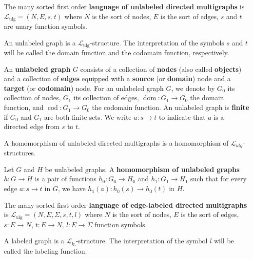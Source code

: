 \begin{definition}
    \label{def:l_ulg}
    The many sorted first order \textbf{language of unlabeled directed multigraphs} is $\mathcal{L}_\text{ulg} \mathop{=} (N,E,s,t)$ where $N$ is the sort of nodes, $E$ is the sort of edges, $s$ and $t$ are unary function symbols.
  \end{definition}
\begin{definition}
    \label{def:ulg}
    An unlabeled graph is a $\mathcal{L}_\text{ulg}$-structure. The interpretation of the symbols $s$ and $t$ will be called the domain function and the codomain function, respectively.
\end{definition}
An \textbf{unlabeled graph} \( G \) consists of a collection of \textbf{nodes} (also called \textbf{objects}) and a collection of \textbf{edges} equipped with a \textbf{source} (or \textbf{domain}) node and a \textbf{target} (or \textbf{codomain}) node. 
For an unlabeled graph \( G \), we denote by \( G_0 \) its collection of nodes, \( G_1 \) its collection of edges, \( \operatorname{dom}:G_1{\to}G_0 \) the domain function, and \( \operatorname{cod}:G_1{\to}G_0 \) the codomain function. An unlabeled graph is \textbf{finite} if \( G_0 \) and \( G_1 \) are both finite sets.
We write \( a: s \mathop{\to} t \) to indicate that \( a \) is a directed edge from \( s \) to \( t \).
\begin{definition}
    \label{def:homomorphism_ulg}
    A homomorphism of unlabeled directed multigraphs is a homomorphism of $\mathcal{L}_{ulg}$-structures.
\end{definition}
Let \( G \) and \( H \) be unlabeled graphs. A \textbf{homomorphism of unlabeled graphs} \( h: G \mathop{\to} H \) is a pair of functions \( h_0: G_0 \mathop{\to} H_0 \) and \( h_1: G_1 \mathop{\to} H_1 \) such that for every edge \( a: s \mathop{\to} t \) in \( G \), we have \( h_1(a) : h_0(s) \mathop{\to} h_0(t) \) in \( H \).
\begin{definition}
    \label{def:l_lg}
    The many sorted first order \textbf{language of edge-labeled directed multigraphs} is $\mathcal{L}_\text{ulg} \mathop{=} (N,E,\Sigma, s,t,l)$ where $N$ is the sort of nodes, $E$ is the sort of edges, $s:E \mathop{\to} N$, $t: E \mathop{\to} N$, $l:E \mathop{\to} \Sigma$ function symbols.
  \end{definition}
\begin{definition}
    \label{def:lg}
    A labeled graph is a $\mathcal{L}_\text{lg}$-structure. The interpretation of the symbol $l$ will be called the labeling function.
\end{definition}
